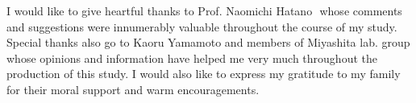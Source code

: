 I would like to give heartful thanks to Prof. Naomichi Hatano ﻿ whose comments and suggestions were innumerably valuable throughout the course of my study. Special thanks also go to Kaoru Yamamoto and members of Miyashita lab. group whose opinions and information have helped me very much throughout the production of this study. I would also like to express my gratitude to my family for their moral support and warm encouragements.
